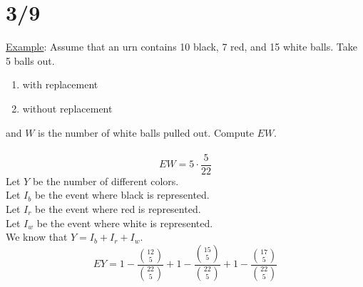 \section*{3/9}
      \underline{Example}: Assume that an urn contains 10 black, 7 red, and 
      15 white balls. Take 5 balls out.
      \begin{enumerate}
        \item with replacement
        \item without replacement
      \end{enumerate}
      and $W$ is the number of white balls pulled out. Compute $EW$.\\\\
      $$
        EW = 5 \cdot \frac{5}{22}
      $$
      Let $Y$ be the number of different colors.\\
      Let $I_b$ be the event where black is represented.\\
      Let $I_r$ be the event where red is represented.\\
      Let $I_w$ be the event where white is represented.\\
      We know that $Y = I_b + I_r + I_w$.\\
      $$
        EY = 1 - \frac{\binom{12}{5}}{\binom{22}{5}} + 1 - 
        \frac{\binom{15}{5}}{\binom{22}{5}} + 1 - \frac{\binom{17}{5}}
        {\binom{22}{5}}
      $$

